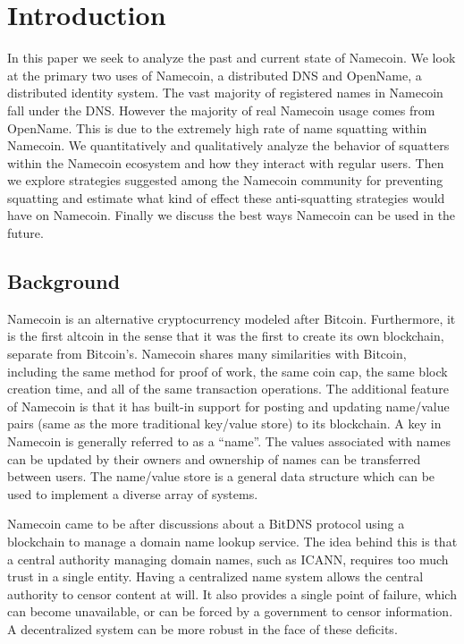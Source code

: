 \section{Introduction}
\label{sec:intro}

In this paper we seek to analyze the past and current state of Namecoin. We look at the primary two uses of Namecoin, a distributed DNS and OpenName, a distributed identity system. The vast majority of registered names in Namecoin fall under the DNS. However the  majority of real Namecoin usage comes from OpenName. This is due to the extremely high rate of name squatting within Namecoin. We quantitatively and qualitatively analyze the behavior of squatters within the Namecoin ecosystem and how they interact with regular users. Then we explore strategies suggested among the Namecoin community for preventing squatting and estimate what kind of effect these anti-squatting strategies would have on Namecoin. Finally we discuss the best ways Namecoin can be used in the future.

\subsection{Background}

Namecoin is an alternative cryptocurrency modeled after Bitcoin\cite{nakamoto2008bitcoin}. Furthermore, it is the first altcoin in the sense that it was the first to create its own blockchain, separate from Bitcoin's. Namecoin shares many similarities with Bitcoin, including the same method for proof of work, the same coin cap, the same block creation time, and all of the same transaction operations. The additional feature of Namecoin is that it has built-in support for posting and updating name/value pairs (same as the more traditional key/value store) to its blockchain. A key in Namecoin is generally referred to as a ``name''. The values associated with names can be updated by their owners and ownership of names can be transferred between users. The name/value store is a general data structure which can be used to implement a diverse array of systems.

Namecoin came to be after discussions about a BitDNS\cite{bitdns} protocol using a blockchain to manage a domain name lookup service. The idea behind this is that a central authority managing domain names, such as ICANN, requires too much trust in a single entity. Having a centralized name system allows the central authority to censor content at will. It also provides a single point of failure, which can become unavailable, or can be forced by a government to censor information. A decentralized system can be more robust in the face of these deficits.

